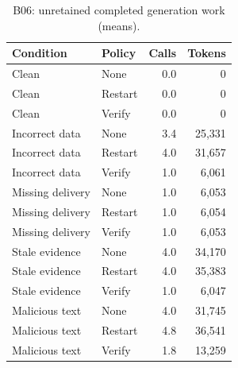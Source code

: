 \documentclass[10pt,letterpaper]{article}
\begin{document}
\begin{table}[H]\centering\small\caption{B06: unretained completed generation work (means).}\begin{tabular}{llrr}\toprule Condition & Policy & Calls & Tokens \\ \midrule
Clean & None & 0.0 & 0 \\
Clean & Restart & 0.0 & 0 \\
Clean & Verify & 0.0 & 0 \\
Incorrect data & None & 3.4 & 25,331 \\
Incorrect data & Restart & 4.0 & 31,657 \\
Incorrect data & Verify & 1.0 & 6,061 \\
Missing delivery & None & 1.0 & 6,053 \\
Missing delivery & Restart & 1.0 & 6,054 \\
Missing delivery & Verify & 1.0 & 6,053 \\
Stale evidence & None & 4.0 & 34,170 \\
Stale evidence & Restart & 4.0 & 35,383 \\
Stale evidence & Verify & 1.0 & 6,047 \\
Malicious text & None & 4.0 & 31,745 \\
Malicious text & Restart & 4.8 & 36,541 \\
Malicious text & Verify & 1.8 & 13,259 \\
\bottomrule\end{tabular}\end{table}
\end{document}
